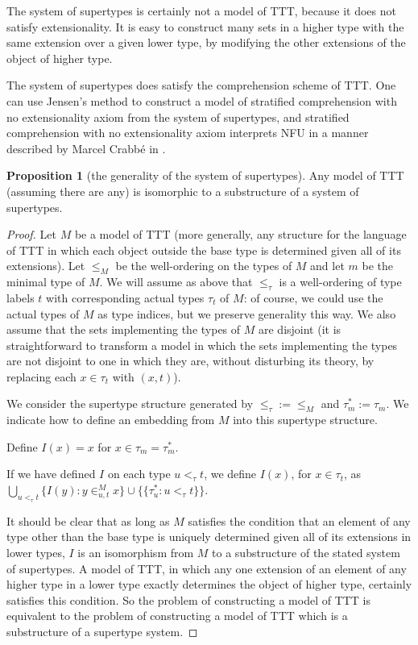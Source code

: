 \documentclass{article}
\theoremstyle{definition}
\newtheorem{proposition}[theorem]{Proposition}
\theoremstyle{remark}
\begin{document}
The system of supertypes is certainly not a model of TTT, because it does not satisfy extensionality.  It is easy to construct
many sets in a higher type with the same extension over a given lower type, by modifying the other extensions of the object of higher type.

The system of supertypes does satisfy the comprehension scheme of TTT.  One can use Jensen's method to construct a model of stratified comprehension with no extensionality axiom from the system of supertypes, and stratified comprehension with no extensionality axiom interprets NFU in a manner described by Marcel Crabb\'e in \cite{marcelsf}.

\begin{proposition}[the generality of the system of supertypes]
Any model of TTT (assuming there are any) is isomorphic to a substructure of a system of supertypes.
\end{proposition}
\begin{proof}
Let $M$ be a model of TTT (more generally, any structure for the language of TTT in which each object outside the base type is determined given all of its extensions).  Let $\leq_M$ be the well-ordering on the types of $M$ and let $m$ be the minimal type of $M$.  We will assume as above that $\leq_\tau$ is a well-ordering of type labels $t$ with corresponding actual types $\tau_t$ of $M$:  of course, we could use the actual types of $M$ as type indices, but we preserve generality this way.    We also assume that the sets implementing the types of $M$ are disjoint (it is straightforward to transform a model in which the sets implementing the types are not disjoint to one in which they are, without disturbing its theory, by replacing each $x \in \tau_t$ with $(x,t)$).

We consider the supertype structure generated by ${\leq_\tau}:={\leq_M}$ and $\tau^*_m := \tau_m$.  We indicate how to define an embedding from $M$ into this supertype structure.

Define $I(x) = x$ for $x \in \tau_m = \tau^*_m$.

If we have defined $I$ on each type $u <_\tau t$, we define $I(x)$, for $x \in \tau_t$, as
$\bigcup_{u <_\tau t} \{I(y):y \in^M_{u,t} x\} \cup \{\{\tau^*_u:u <_\tau t\}\}$.

It should be clear that as long as $M$ satisfies the condition that an element of any type other than the base type is uniquely determined given all of its extensions in lower types, $I$ is an isomorphism from $M$ to a substructure of the stated system of supertypes.  A model of TTT, in which any one extension of an element of any higher type in a lower type exactly determines the object of higher type, certainly satisfies this condition.  So the problem of constructing a model of TTT is equivalent to the problem of constructing a model of TTT which is a substructure of a supertype system.
\end{proof}
\end{document}
